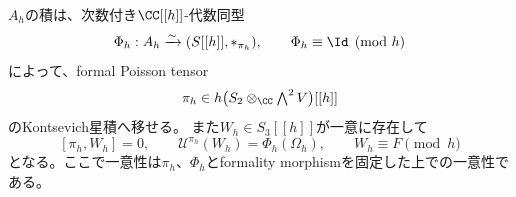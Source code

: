 \begin{lemma}[一般の結合変形を扱うformality]
\label{fo:lem:full-formality}
$A_h$の積は、次数付き$\CC[[h]]$-代数同型
\begin{equation}\label{fo:eq:Phi}
 \Phi_h:A_h\xrightarrow{\sim}(S[[h]],*_{\pi_h}),\qquad
 \Phi_h\equiv\Id\pmod h
\end{equation}
によって、formal Poisson tensor
\begin{equation}\label{fo:eq:formal-pi}
 \pi_h\in h\bigl(S_2\otimes_\CC\textstyle\bigwedge^2 V\bigr)[[h]]
\end{equation}
のKontsevich星積へ移せる。
また$W_h\in S_3[[h]]$が一意に存在して
\begin{equation}\label{fo:eq:central-inverse}
 [\pi_h,W_h]=0,\qquad
 \mathcal U^{\pi_h}(W_h)=\Phi_h(\Omega_h),\qquad
 W_h\equiv F\pmod h
\end{equation}
となる。ここで一意性は$\pi_h$、$\Phi_h$とformality morphismを固定した上での一意性である。
\end{lemma}

